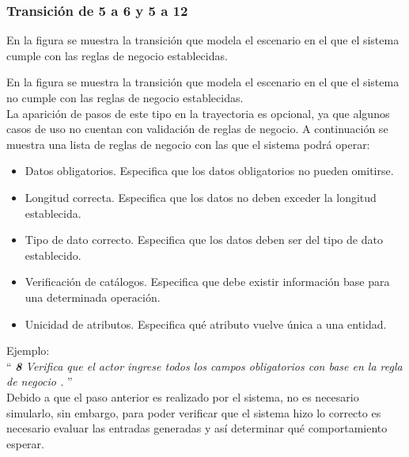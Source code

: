 \subsubsection{Transición de 5 a 6 y 5 a 12}
 
 En la figura  se muestra la transición que modela el escenario en el que el sistema cumple con las reglas de negocio establecidas.
  
 
 En la figura  se muestra la transición que modela el escenario en el que el sistema no cumple con las reglas de negocio establecidas.\\
  
  
 La aparición de pasos de este tipo en la trayectoria es opcional, ya que algunos casos de uso no cuentan con validación de reglas de negocio. A continuación se muestra una lista de reglas de negocio con las que el sistema podrá operar:
 
 \begin{itemize}
	 \item Datos obligatorios. Especifica que los datos obligatorios no pueden omitirse.
	 \item Longitud correcta. Especifica que los datos no deben exceder la longitud establecida.
	 \item Tipo de dato correcto. Especifica que los datos deben ser del tipo de dato establecido.
	 \item Verificación de catálogos. Especifica que debe existir información base para una determinada operación.
	 \item Unicidad de atributos. Especifica qué atributo vuelve única a una entidad.\\
 \end{itemize}
 

Ejemplo:\\

 ``{\it
    {\bf 8} \UCsist Verifica que el actor ingrese todos los campos obligatorios con base en la regla de negocio  . 
 }''\\
	
	Debido a que el paso anterior es realizado por el sistema, no es necesario simularlo, sin embargo, para poder verificar que el sistema hizo lo correcto es necesario evaluar las entradas generadas y así determinar qué comportamiento esperar.
	
